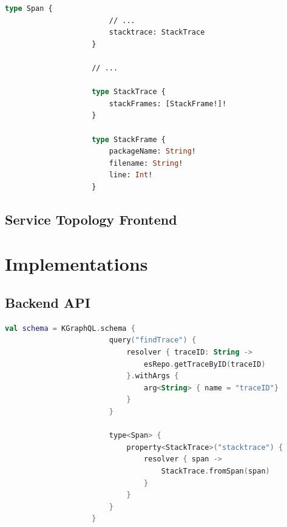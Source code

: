 \documentclass[12pt,pdftex,titlepage]{report}
\begin{document}
                \begin{lstlisting}[caption={GraphQL schema updated with stack- trace and frame objects, unchanged fields and objects filtered.}, language=GraphQL, gobble=20, label={lst:stack}]
                    type Span {
                        // ...
                        stacktrace: StackTrace
                    }

                    // ...

                    type StackTrace {
                        stackFrames: [StackFrame!]!
                    }

                    type StackFrame {
                        packageName: String!
                        filename: String!
                        line: Int!
                    }
                \end{lstlisting}

            \subsection{Service Topology Frontend}

        \newpage          
        \section{Implementations}    
            \subsection{Backend API}
                \begin{lstlisting}[caption=Kotlin snippet of defining the GraphQL schema using the Kotlin DSL., language=Kotlin, gobble=20]
                    val schema = KGraphQL.schema { 
                        query("findTrace") { 
                            resolver { traceID: String ->
                                esRepo.getTraceByID(traceID)
                            }.withArgs { 
                                arg<String> { name = "traceID"}
                            }
                        }

                        type<Span> {
                            property<StackTrace>("stacktrace") { 
                                resolver { span ->
                                    StackTrace.fromSpan(span)
                                }
                            }
                        }
                    }                
                \end{lstlisting}
\end{document}
